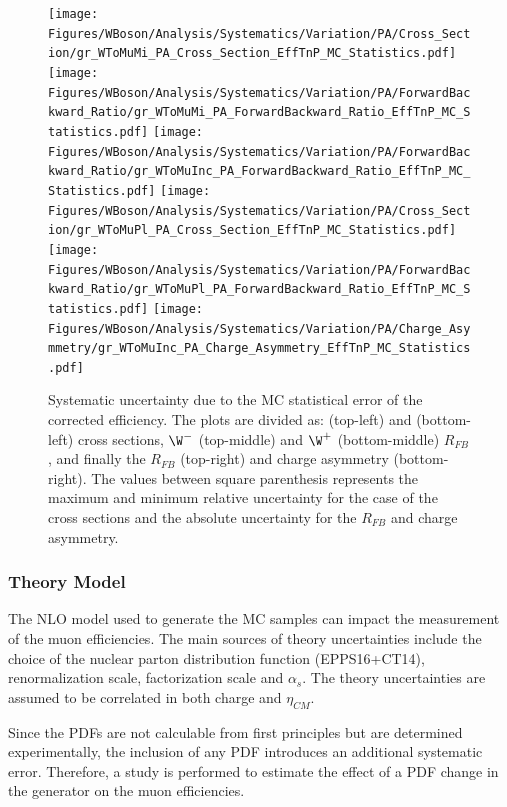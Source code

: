 \begin{figure}[!htbp]
 \begin{center}
  \texttt{[image: Figures/WBoson/Analysis/Systematics/Variation/PA/Cross\_Section/gr\_WToMuMi\_PA\_Cross\_Section\_EffTnP\_MC\_Statistics.pdf]}
  \texttt{[image: Figures/WBoson/Analysis/Systematics/Variation/PA/ForwardBackward\_Ratio/gr\_WToMuMi\_PA\_ForwardBackward\_Ratio\_EffTnP\_MC\_Statistics.pdf]}
  \texttt{[image: Figures/WBoson/Analysis/Systematics/Variation/PA/ForwardBackward\_Ratio/gr\_WToMuInc\_PA\_ForwardBackward\_Ratio\_EffTnP\_MC\_Statistics.pdf]}
  \texttt{[image: Figures/WBoson/Analysis/Systematics/Variation/PA/Cross\_Section/gr\_WToMuPl\_PA\_Cross\_Section\_EffTnP\_MC\_Statistics.pdf]}
  \texttt{[image: Figures/WBoson/Analysis/Systematics/Variation/PA/ForwardBackward\_Ratio/gr\_WToMuPl\_PA\_ForwardBackward\_Ratio\_EffTnP\_MC\_Statistics.pdf]}
  \texttt{[image: Figures/WBoson/Analysis/Systematics/Variation/PA/Charge\_Asymmetry/gr\_WToMuInc\_PA\_Charge\_Asymmetry\_EffTnP\_MC\_Statistics.pdf]}
 \end{center}
 \caption{Systematic uncertainty due to the MC statistical error of the corrected efficiency. The plots are divided as: \WToMuNuMi (top-left) and \WToMuNuPl (bottom-left) cross sections, $\W^{-}$ (top-middle) and $\W^{+}$ (bottom-middle) $R_{FB}$, and finally the \W $R_{FB}$ (top-right) and \W charge asymmetry (bottom-right). The values between square parenthesis represents the maximum and minimum relative uncertainty for the case of the cross sections and the absolute uncertainty for the $R_{FB}$ and charge asymmetry.}
 \label{fig:Systematic_Eff_MC_Statistics}
\end{figure}

\subsubsection{Theory Model}

The NLO model used to generate the MC \POWHEG samples can impact the measurement of the muon efficiencies. The main sources of theory uncertainties include the choice of the nuclear parton distribution function (EPPS16+CT14), renormalization scale, factorization scale and $\alpha_{s}$. The theory uncertainties are assumed to be correlated in both charge and $\eta_{CM}$.

Since the PDFs are not calculable from first principles but are determined experimentally, the inclusion of any PDF introduces an additional systematic error. Therefore, a study is performed to estimate the effect of a PDF change in the \POWHEG generator on the muon efficiencies.

